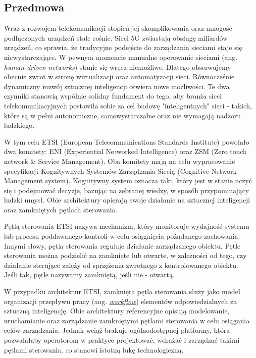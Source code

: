 \subsection{Przedmowa}

Wraz z rozwojem telekomunikacji stopień jej skomplikowania oraz mnogość podłączonych urządzeń stale rośnie. Sieci 5G zwiastują obsługę miliardów urządzeń, co sprawia, że tradycyjne podejście do zarządzania sieciami staje się niewystarczające. W pewnym momencie manualne operowanie sieciami (ang. \textit{human-driven networks}) stanie się wręcz niemożliwe. Dlatego obserwujemy obecnie zwrot w stronę wirtualizacji oraz automatyzacji sieci. Równocześnie dynamiczny rozwój sztucznej inteligencji otwiera nowe możliwości. Te dwa czynniki stanowią wspólnie solidny fundament do tego, aby branża sieci telekomunikacyjnych postawiła sobie za cel budowę "inteligentnych" sieci - takich, które są w pełni autonomiczne, samowystarczalne oraz nie wymagają nadzoru ludzkiego.

W tym celu ETSI (European Telecommunications Standards Institute) powołało dwa komitety: ENI (Experiential Networked Intelligence) oraz ZSM (Zero touch network \& Service Management). Oba komitety mają na celu wypracowanie specyfikacji Kognitywnych Systemów Zarządzania Siecią (Cognitive Network Management system). Kognitywny system oznacza taki, który jest w stanie uczyć się i podejmować decyzje, bazując na zebranej wiedzy, w sposób przypominający ludzki umysł. Obie architektury opierają swoje działanie na sztucznej inteligencji oraz zamkniętych pętlach sterowania. 

Pętlą sterowania ETSI nazywa mechanizm, który monitoruje wydajność systemu lub procesu poddawanego kontroli w celu osiągnięcia pożądanego zachowania. Innymi słowy, pętla sterowania reguluje działanie zarządzanego obiektu. Pętle sterowania można podzielić na zamknięte lub otwarte, w zależności od tego, czy działanie sterujące zależy od sprzężenia zwrotnego z kontrolowanego obiektu. Jeśli tak, pętle nazywamy zamkniętą, jeśli nie - otwartą. 

W przypadku architektur ETSI, zamknięta pętla sterowania służy jako model organizacji przepływu pracy (ang. \hyperlink{def:workflow}{\textit{workflow}}) elementów odpowiedzialnych za sztuczną inteligencję. Obie architektury referencyjne opisują modelowanie, uruchamianie oraz zarządzanie zamkniętymi pętlami sterowania w celu osiągania celów zarządzania. Jednak wciąż brakuje ogólnodostępnej platformy, która pozwalałaby operatorom w praktyce projektować, wdrażać i zarządzać takimi pętlami sterowania, co stanowi istotną lukę technologiczną. 
